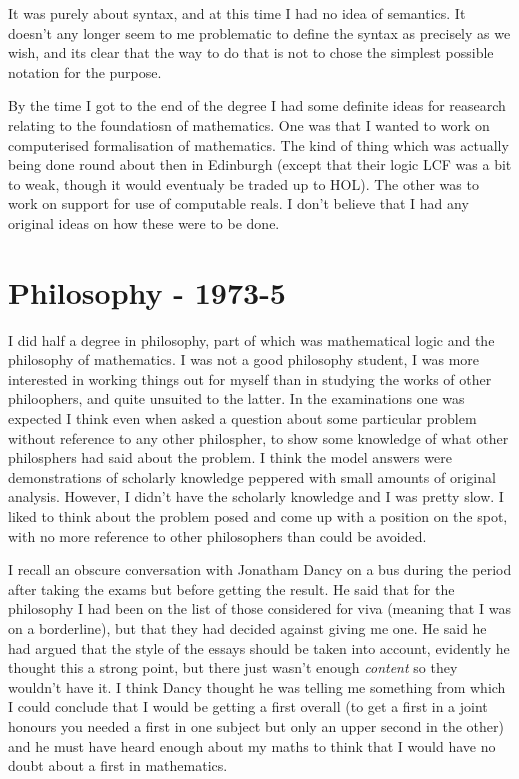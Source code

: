 \documentclass[10pt,titlepage]{book}
\begin{document}
It was purely about syntax, and at this time I had no idea of semantics.
It doesn't any longer seem to me problematic to define the syntax as precisely as we wish, and its clear that the way to do that is not to chose the simplest possible notation for the purpose.

By the time I got to the end of the degree I had some definite ideas for reasearch relating to the foundatiosn of mathematics.
One was that I wanted to work on computerised formalisation of mathematics.
The kind of thing which was actually being done round about then in Edinburgh (except that their logic LCF was a bit to weak, though it would eventualy be traded up to HOL).
The other was to work on support for use of computable reals.
I don't believe that I had any original ideas on how these were to be done.

\section{Philosophy - 1973-5}

I did half a degree in philosophy, part of which was mathematical logic and the philosophy of mathematics.
I was not a good philosophy student, I was more interested in working things out for myself than in studying the works of other philoophers, and quite unsuited to the latter.
In the examinations one was expected I think even when asked a question about some particular problem without reference to any other philospher, to show some knowledge of what other philosphers had said about the problem.
I think the model answers were demonstrations of scholarly knowledge peppered with small amounts of original analysis.
However, I didn't have the scholarly knowledge and I was pretty slow.
I liked to think about the problem posed and come up with a position on the spot, with no more reference to other philosophers than could be avoided.

I recall an obscure conversation with Jonatham Dancy on a bus during the period after taking the exams but before getting the result.
He said that for the philosophy I had been on the list of those considered for viva (meaning that I was on a borderline), but that they had decided against giving me one.
He said he had argued that the style of the essays should be taken into account, evidently he thought this a strong point, but there just wasn't enough {\it content} so they wouldn't have it.
I think Dancy thought he was telling me something from which I could conclude that I would be getting a first overall (to get a first in a joint honours you needed a first in one subject but only an upper second in the other) and he must have heard enough about my maths to think that I would have no doubt about a first in mathematics.
\end{document}
